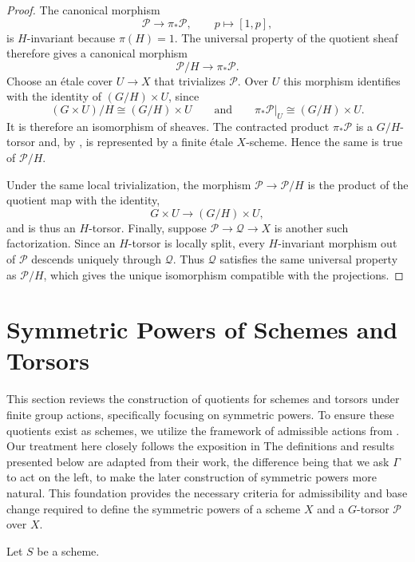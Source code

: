 \begin{proof}
The canonical morphism
\[
\mathcal{P}\longrightarrow\pi_*\mathcal{P},
\qquad p\longmapsto[1,p],
\]
is $H$-invariant because $\pi(H)=1$. The universal property of the quotient
sheaf therefore gives a canonical morphism
\[
\mathcal{P}/H\longrightarrow\pi_*\mathcal{P}.
\]
Choose an étale cover $U\to X$ that trivializes $\mathcal{P}$. Over $U$ this
morphism identifies with the identity of $(G/H)\times U$, since
\[
(G\times U)/H\cong(G/H)\times U
\qquad\text{and}\qquad
\pi_*\mathcal{P}|_U\cong(G/H)\times U.
\]
It is therefore an isomorphism of sheaves. The contracted product
$\pi_*\mathcal{P}$ is a $G/H$-torsor and, by
, is represented by a finite
étale $X$-scheme. Hence the same is true of $\mathcal{P}/H$.

Under the same local trivialization, the morphism
$\mathcal{P}\to\mathcal{P}/H$ is the product of the quotient map with the
identity,
\[
G\times U\longrightarrow(G/H)\times U,
\]
and is thus an $H$-torsor. Finally, suppose
$\mathcal{P}\to\mathcal{Q}\to X$ is another such factorization. Since an
$H$-torsor is locally split, every $H$-invariant morphism out of
$\mathcal{P}$ descends uniquely through $\mathcal{Q}$. Thus $\mathcal{Q}$
satisfies the same universal property as $\mathcal{P}/H$, which gives the
unique isomorphism compatible with the projections.
\end{proof}

\section{Symmetric Powers of Schemes and Torsors}
This section reviews the construction of quotients for schemes and torsors under finite group actions, specifically focusing on symmetric powers. 
To ensure these quotients exist as schemes, we utilize the framework of admissible actions from \cite{sga1}. 
Our treatment here closely follows the exposition in \cite{Guignard2018}
The definitions and results presented below are adapted from their work, the difference being that we ask $\Gamma$ to act on the left, to make the later construction of symmetric powers more natural. 
This foundation provides the necessary criteria for admissibility and base change required to define the symmetric powers of a scheme $X$
 and a $G$-torsor $\mathcal{P}$ over $X$.


Let $S$ be a scheme.

